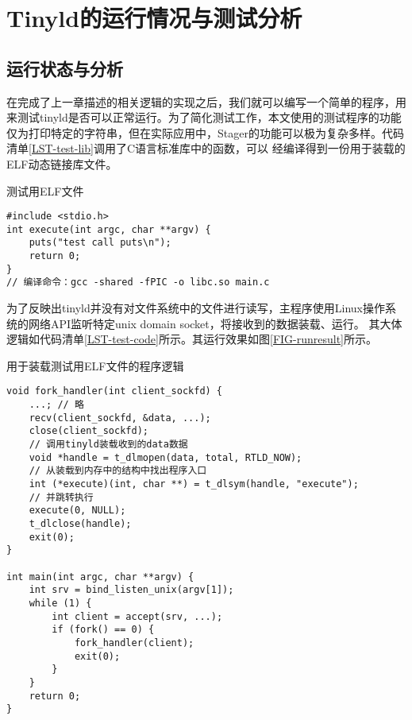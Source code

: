\chapter{Tinyld的运行情况与测试分析}

\section{运行状态与分析}

在完成了上一章描述的相关逻辑的实现之后，我们就可以编写一个简单的程序，用来测试tinyld是否可以正常运行。为了简化测试工作，本文使用的测试程序的功能
仅为打印特定的字符串，但在实际应用中，Stager的功能可以极为复杂多样。代码清单\ref{LST-test-lib}调用了C语言标准库中的函数，可以
经编译得到一份用于装载的ELF动态链接库文件。

\begin{listing}
\caption{测试用ELF文件}
\label{LST-test-lib}
\begin{verbatim}
#include <stdio.h>
int execute(int argc, char **argv) {
    puts("test call puts\n");
    return 0;
}
// 编译命令：gcc -shared -fPIC -o libc.so main.c
\end{verbatim}
\end{listing}

为了反映出tinyld并没有对文件系统中的文件进行读写，主程序使用Linux操作系统的网络API监听特定unix domain socket，将接收到的数据装载、运行。
其大体逻辑如代码清单\ref{LST-test-code}所示。其运行效果如图\ref{FIG-runresult}所示。

\begin{listing}
\caption{用于装载测试用ELF文件的程序逻辑}
\label{LST-test-code}
\begin{verbatim}
void fork_handler(int client_sockfd) {
    ...; // 略
    recv(client_sockfd, &data, ...);
    close(client_sockfd);
    // 调用tinyld装载收到的data数据
    void *handle = t_dlmopen(data, total, RTLD_NOW);
    // 从装载到内存中的结构中找出程序入口
    int (*execute)(int, char **) = t_dlsym(handle, "execute");
    // 并跳转执行
    execute(0, NULL);
    t_dlclose(handle);
    exit(0);
}

int main(int argc, char **argv) {
    int srv = bind_listen_unix(argv[1]);
    while (1) {
        int client = accept(srv, ...);
        if (fork() == 0) {
            fork_handler(client);
            exit(0);
        }
    }
    return 0;
}
\end{verbatim}
\end{listing}

